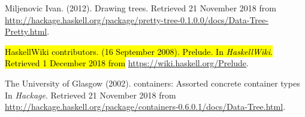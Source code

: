 \documentclass[format=acmlarge, review=false, nonacm=false, screen=true]{acmart}
\begin{document}
\begin{thebibliography}{99}
    Miljenovic Ivan.
    (2012).
    Drawing trees.
    Retrieved 21 November 2018 from
      \url{http://hackage.haskell.org/package/pretty-tree-0.1.0.0/docs/Data-Tree-Pretty.html}.
      
    \hl{HaskellWiki contributors.
    (16 September 2008).
    Prelude.
    In \textit{HaskellWiki}.
    Retrieved 1 December 2018 from} \url{https://wiki.haskell.org/Prelude}.
      
    The University of Glasgow
    (2002).
    containers: Assorted concrete container types
    In \textit{Hackage}.
    Retrieved 21 November 2018 from \url{http://hackage.haskell.org/package/containers-0.6.0.1/docs/Data-Tree.html}.
\end{thebibliography}
\end{document}
